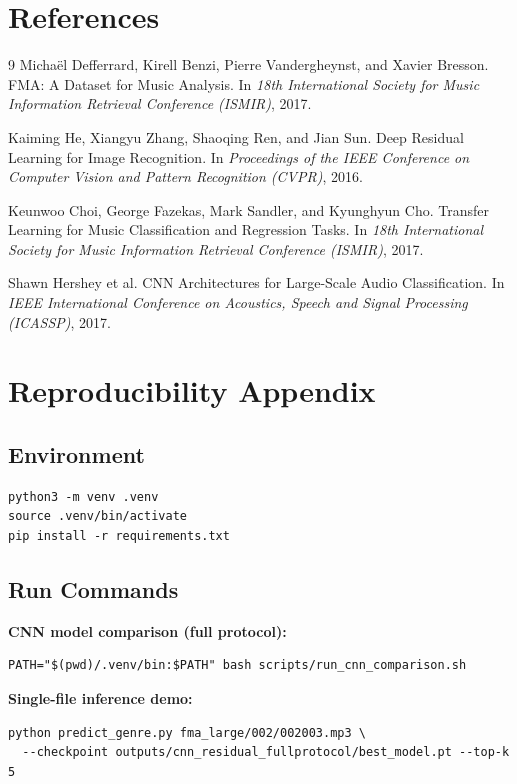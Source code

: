 \documentclass[11pt,a4paper]{article}
\begin{document}
\section{References}
\begin{thebibliography}{9}
Micha\"el Defferrard, Kirell Benzi, Pierre Vandergheynst, and Xavier Bresson.
\newblock FMA: A Dataset for Music Analysis.
\newblock In \textit{18th International Society for Music Information Retrieval Conference (ISMIR)}, 2017.

Kaiming He, Xiangyu Zhang, Shaoqing Ren, and Jian Sun.
\newblock Deep Residual Learning for Image Recognition.
\newblock In \textit{Proceedings of the IEEE Conference on Computer Vision and Pattern Recognition (CVPR)}, 2016.

Keunwoo Choi, George Fazekas, Mark Sandler, and Kyunghyun Cho.
\newblock Transfer Learning for Music Classification and Regression Tasks.
\newblock In \textit{18th International Society for Music Information Retrieval Conference (ISMIR)}, 2017.

Shawn Hershey et al.
\newblock CNN Architectures for Large-Scale Audio Classification.
\newblock In \textit{IEEE International Conference on Acoustics, Speech and Signal Processing (ICASSP)}, 2017.
\end{thebibliography}

\section{Reproducibility Appendix}
\subsection{Environment}
\begin{verbatim}
python3 -m venv .venv
source .venv/bin/activate
pip install -r requirements.txt
\end{verbatim}

\subsection{Run Commands}
\textbf{CNN model comparison (full protocol):}
\begin{verbatim}
PATH="$(pwd)/.venv/bin:$PATH" bash scripts/run_cnn_comparison.sh
\end{verbatim}

\textbf{Single-file inference demo:}
\begin{verbatim}
python predict_genre.py fma_large/002/002003.mp3 \
  --checkpoint outputs/cnn_residual_fullprotocol/best_model.pt --top-k 5
\end{verbatim}
\end{document}
